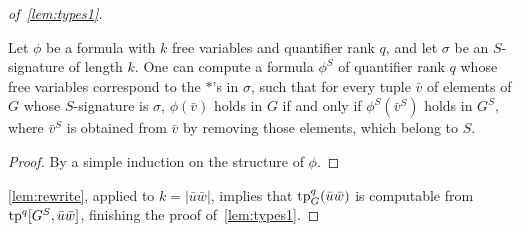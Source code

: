 \begin{proof}[of~\cref{lem:types1}]
\begin{lemma}\label{lem:rewrite}
  Let $\phi$ be a formula
  with $k$ free variables and quantifier rank $q$, 
  and let $\sigma$ be an $S$-signature of length $k$.
  One can compute a formula $\phi^S$ of quantifier rank $q$
  whose free variables correspond to the $\ast$'s in $\sigma$,
  such that for every tuple $\bar v$ of elements of $G$
  whose $S$-signature is $\sigma$,
   $\phi(\bar v)$ holds in $G$
  if and only if $\phi^S(\bar v^S)$ holds in $G^S$, where $\bar v^S$ is obtained from $\bar v$ by removing 
  those elements, which belong to $S$.
\end{lemma}
\begin{proof}\label{pf:}
By a simple induction on the structure of $\phi$.
\end{proof}
%
%

\cref{lem:rewrite}, applied to $k=|\bar u\bar w|$, implies that 
$\mathrm{tp}^q_G(\bar u\bar w)$ is computable from
	$\mathrm{tp}^q[G^S, \bar u\bar w]$, finishing the proof of~\cref{lem:types1}.	
\end{proof}


